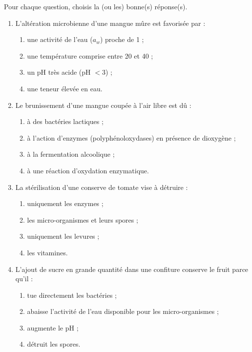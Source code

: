 \documentclass[11pt]{article}
\begin{document}
\begin{exercice}
Pour chaque question, choisis la (ou les) bonne(s) réponse(s).
\begin{enumerate}
\item L'altération microbienne d'une mangue mûre est favorisée par :
\begin{enumerate}
\item une activité de l'eau ($a_w$) proche de 1 ;
\item une température comprise entre 20 \textcelsius{} et 40 \textcelsius{} ;
\item un pH très acide (pH $< 3$) ;
\item une teneur élevée en eau.
\end{enumerate}
\item Le brunissement d'une mangue coupée à l'air libre est dû :
\begin{enumerate}
\item à des bactéries lactiques ;
\item à l'action d'enzymes (polyphénoloxydases) en présence de dioxygène ;
\item à la fermentation alcoolique ;
\item à une réaction d'oxydation enzymatique.
\end{enumerate}
\item La stérilisation d'une conserve de tomate vise à détruire :
\begin{enumerate}
\item uniquement les enzymes ;
\item les micro-organismes et leurs spores ;
\item uniquement les levures ;
\item les vitamines.
\end{enumerate}
\item L'ajout de sucre en grande quantité dans une confiture conserve le fruit parce qu'il :
\begin{enumerate}
\item tue directement les bactéries ;
\item abaisse l'activité de l'eau disponible pour les micro-organismes ;
\item augmente le pH ;
\item détruit les spores.
\end{enumerate}
\end{enumerate}
\end{exercice}
\end{document}
